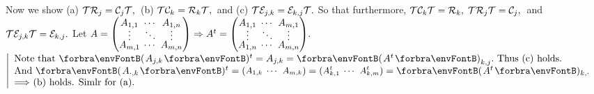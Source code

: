 Now we show (a) \uline{$\mathcal{T}\mathcal{R}_j=\mathcal{C}_j\mathcal{T},$} \,(b) \uline{$\mathcal{T}\mathcal{C}_k=\mathcal{R}_k\mathcal{T},$} \,and (c) \uline{$\mathcal{T}\mathcal{E}_{j,k}=\mathcal{E}_{k,j}\mathcal{T}.$}\TextB{\vspace{2pt}}
So that furthermore, $\mathcal{T}\mathcal{C}_k\mathcal{T}=\mathcal{R}_k,\;\mathcal{T}\mathcal{R}_j\mathcal{T}=\mathcal{C}_j,$ \,and $\mathcal{T}\mathcal{E}_{j,k}\mathcal{T}=\mathcal{E}_{k,j}.$\TextB{\vspace{4pt}}
Let $A={}{\normalsize\begin{pmatrix}A_{1,1} &\hspace{-6pt} \cdots &\hspace{-6pt} A_{1,n}\\[-4pt] \vdots &\hspace{-6pt} \ddots &\hspace{-6pt} \vdots\\[-4pt] A_{m,1} &\hspace{-6pt} \cdots &\hspace{-6pt} A_{m,n}\end{pmatrix}}\Rightarrow A^t={}{\normalsize\begin{pmatrix}A_{1,1} &\hspace{-6pt} \cdots &\hspace{-6pt} A_{m,1}\\[-4pt] \vdots &\hspace{-6pt} \ddots &\hspace{-6pt} \vdots\\[-4pt] A_{1,n} &\hspace{-6pt} \cdots &\hspace{-6pt} A_{m,n}\end{pmatrix}}.$ \;$\MathLeftMid{l}{\!\!$
Note that $\Par{A_{j,k}}{^t}=A_{j,k}=\Par{A^t}_{k,j}.$ Thus (c) holds.$\\$
\!\!And $\Par{A_{\cdot,k}}{^t}={}{\small\begin{pmatrix}A_{1,k} &\hspace{-6pt} \cdots &\hspace{-6pt}A_{m,k}\end{pmatrix}}{}={}{\small\begin{pmatrix}A^t_{k,1} &\hspace{-6pt} \cdots &\hspace{-6pt}A^t_{k,m}\end{pmatrix}}{}=\Par{A^t}{_{k,\cdot}}\\$
\!\!$\Longrightarrow$ (b) holds. Simlr for (a).$}$\par\vspace{6pt}
\SepLine

